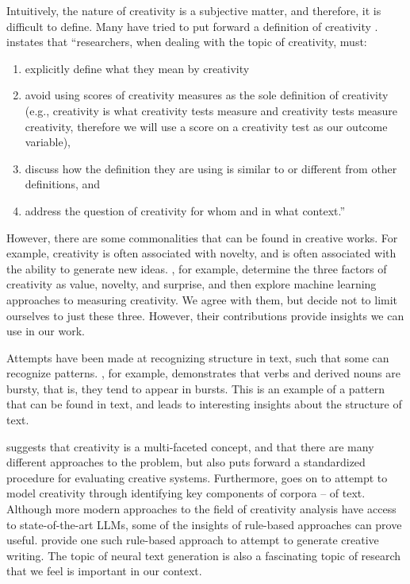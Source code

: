 Intuitively, the nature of creativity is a subjective matter, and therefore, it is difficult to define. Many have tried to put forward a definition of creativity \citep{runco_standard_2012}. \cite{plucker2004creativity} instates that ``researchers, when dealing with the topic of creativity, must:

\begin{enumerate}
    \item explicitly define what they mean by creativity
    \item avoid using scores of creativity measures as the sole definition of creativity (e.g., creativity is what creativity tests measure and creativity tests measure creativity, therefore we will use a score on a creativity test as our outcome variable),
    \item discuss how the definition they are using is similar to or different from other definitions, and 
    \item address the question of creativity for whom and in what context.''
\end{enumerate}

However, there are some commonalities that can be found in creative works. For example, creativity is often associated with novelty, and is often associated with the ability to generate new ideas. \cite{franceschelli_deepcreativity_2022}, for example, determine the three factors of creativity as value, novelty, and surprise, and then explore machine learning approaches to measuring creativity. We agree with them, but decide not to limit ourselves to just these three. However, their contributions provide insights we can use in our work. 


Attempts have been made at recognizing structure in text, such that some can recognize patterns. \cite{pierrehumbert_burstiness_2012}, for example, demonstrates that verbs and derived nouns are bursty, that is, they tend to appear in bursts. This is an example of a pattern that can be found in text, and leads to interesting insights about the structure of text.

\cite{Jordanous2012} suggests that creativity is a multi-faceted concept, and that there are many different approaches to the problem, but also puts forward a standardized procedure for evaluating creative systems. Furthermore, \cite{jordanous_modelling_2016} goes on to attempt to model creativity through identifying key components of corpora -- of text. Although more modern approaches to the field of creativity analysis have access to state-of-the-art LLMs, some of the insights of rule-based approaches can prove useful. \cite{perez_mexica_2001} provide one such rule-based approach to attempt to generate creative writing. The topic of neural text generation is also a fascinating topic of research that we feel is important in our context.

